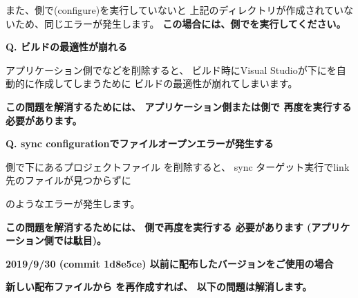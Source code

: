 また、\SprLib 側で\cmake (configure)を実行していないと 
上記のディレクトリが作成されていないため、同じエラーが発生します。
\bf{この場合には、\SprLib 側で\cmake を実行してください。}

\thinrule{\linewidth}

\bf{Q. ビルドの最適性が崩れる}
\label{subsec:QandA:CrumbleBuildOptimizeation}

\medskip
アプリケーション側でなどを削除すると、
ビルド時にVisual Studioが\BldDir 下にを自動的に作成してしまうために
ビルドの最適性が崩れてしまいます。


\medskip
\bf{この問題を解消するためには、
アプリケーション側または\SprLib 側で 再度\cmake を実行する必要があります。}

\thinrule{\linewidth}

\bf{Q. sync configurationでファイルオープンエラーが発生する}

\medskip
\SprLib 側で下にあるプロジェクトファイル
を削除すると、
sync ターゲット実行でlink先のファイルが見つからずに


のようなエラーが発生します。

\bf{この問題を解消するためには、
\SprLib 側で再度\cmake を実行する 必要があります (アプリケーション側では駄目)。}

\thinrule{\linewidth}

\bf{2019/9/30 (commit 1d8e5ce) 以前に配布したバージョンをご使用の場合}

\bf{新しい配布ファイルから \CMakeLists{} を再作成すれば、 以下の問題は解消します。}

